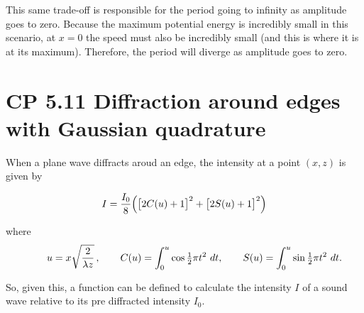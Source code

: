 \documentclass[11pt]{article}
\begin{document}
This same trade-off is responsible for the period going to infinity as
amplitude goes to zero. Because the maximum potential energy is
incredibly small in this scenario, at \(x=0\) the speed must also be
incredibly small (and this is where it is at its maximum). Therefore,
the period will diverge as amplitude goes to zero.

    \section{CP 5.11 Diffraction around edges with Gaussian
quadrature}\label{cp-5.11-diffraction-around-edges-with-gaussian-quadrature}

When a plane wave diffracts aroud an edge, the intensity at a point
\((x,z)\) is given by

\[I = \frac{I_0}{8} \Bigl( \bigl[ 2C(u) + 1 \bigr]^2 + \bigl[ 2S(u) + 1 \bigr]^2 \Bigr)\]

where
\[\qquad u = x \sqrt{2\over\lambda z}\,, \qquad C(u) = \int_0^u \cos \tfrac12\pi t^2 \ dt, \qquad S(u) = \int_0^u \sin \tfrac12\pi t^2 \ dt.\]

So, given this, a function can be defined to calculate the intensity
\(I\) of a sound wave relative to its pre diffracted intensity \(I_0.\)
\end{document}
